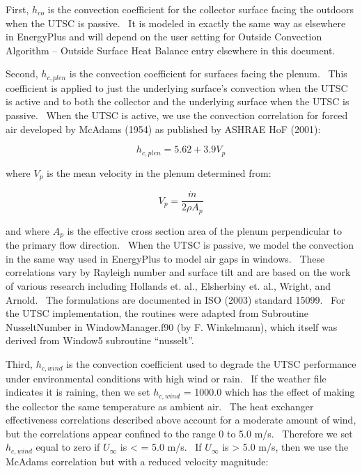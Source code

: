 First, \({h_{co}}\) is the convection coefficient for the collector surface facing the outdoors when the UTSC is passive.~ It is modeled in exactly the same way as elsewhere in EnergyPlus and will depend on the user setting for Outside Convection Algorithm -- Outside Surface Heat Balance entry elsewhere in this document.

Second, \({h_{c,plen}}\) is the convection coefficient for surfaces facing the plenum.~ This coefficient is applied to just the underlying surface's convection when the UTSC is active and to both the collector and the underlying surface when the UTSC is passive.~ When the UTSC is active, we use the convection correlation for forced air developed by McAdams (1954) as published by ASHRAE HoF (2001):

\begin{equation}
{h_{c,plen}} = 5.62 + 3.9{V_p}
\end{equation}

where \({V_p}\) is the mean velocity in the plenum determined from:

\begin{equation}
{V_p} = \frac{{\dot m}}{{2\rho {A_p}}}
\end{equation}

and where \({A_p}\) is the effective cross section area of the plenum perpendicular to the primary flow direction.~ When the UTSC is passive, we model the convection in the same way used in EnergyPlus to model air gaps in windows.~ These correlations vary by Rayleigh number and surface tilt and are based on the work of various research including Hollands et. al., Elsherbiny et. al., Wright, and Arnold.~ The formulations are documented in ISO (2003) standard 15099.~ For the UTSC implementation, the routines were adapted from Subroutine NusseltNumber in WindowManager.f90 (by F. Winkelmann), which itself was derived from Window5 subroutine ``nusselt''.

Third, \({h_{c,wind}}\) is the convection coefficient used to degrade the UTSC performance under environmental conditions with high wind or rain.~ If the weather file indicates it is raining, then we set \({h_{c,wind}}\) = 1000.0 which has the effect of making the collector the same temperature as ambient air.~ The heat exchanger effectiveness correlations described above account for a moderate amount of wind, but the correlations appear confined to the range 0 to 5.0 m/s.~ Therefore we set \({h_{c,wind}}\) equal to zero if \({U_\infty }\) is \textless{} = 5.0 m/s.~ If \({U_\infty }\) is \textgreater{} 5.0 m/s, then we use the McAdams correlation but with a reduced velocity magnitude:

